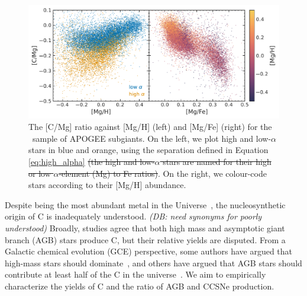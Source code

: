 \documentclass[fleqn,
usenatbib]{mnras}
\newcommand{\apogee}{APOGEE}
\newcommand{\dbstrike}[1]{{\color{Thistle} \sout{#1}}}
\newcommand{\dbadd}[1]{{\color{Thistle} #1}}
\newcommand{\dbnote}[1]{ {\color{Thistle} \textit{\small (DB: #1)}} }
\begin{document}
\begin{figure}
    \centering
    \includegraphics{subgiants.pdf}
    \caption{The [C/Mg] ratio against [Mg/H] (left) and [Mg/Fe] (right) for the \citet{jack}~sample of \apogee{} subgiants. On the left, we plot high and low-$\alpha$ stars in blue and orange, using the separation defined in Equation \ref{eq:high_alpha} \dbstrike{(the high and low-$\alpha$ stars are named for their high or low $\alpha$-element (Mg) to Fe ratios)}. On the right, we colour-code stars according to their [Mg/H] abundance.} \label{fig:subgiants}
\end{figure}



Despite being the most abundant metal in the Universe~\citep[e.g.][]{magg+22}, the nucleosynthetic origin of C is inadequately understood. \dbnote{need synonyms for poorly understood}
Broadly, studies agree that both high mass and asymptotic giant branch (AGB) stars produce C, but their relative yields are disputed.
From a Galactic chemical evolution (GCE) perspective, some authors have argued that high-mass stars should dominate~\citep[e.g.][]{prantzos+94, HEK00, romano+20, franchini+20, gustafsson22}, and others have argued that AGB stars should contribute at least half of the C in the universe~\citep[e.g.][]{tinsley79, chiappini+03, mattsson10, KKU11, rybizki+17, KKL20}. 
\dbadd{We aim to empirically characterize the yields of C and the ratio of AGB and CCSNe production.}

\end{document}
